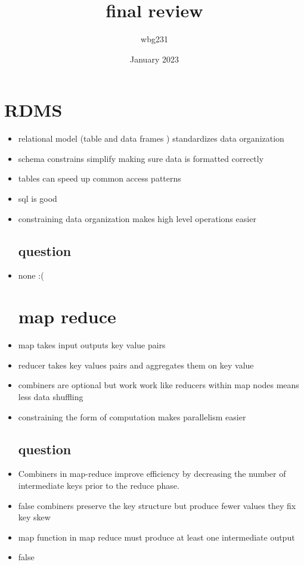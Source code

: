 \documentclass{article}
\title{final review }
\author{wbg231 }
\date{January 2023}
\begin{document}
\maketitle

\section{RDMS}
\begin{itemize}
\subsection*{review}
\item relational model (table and data frames ) standardizes data organization 
\item schema constrains simplify making sure data is formatted correctly
\item tables can speed up common access patterns 
\item sql is good 
\item constraining data organization makes high level operations easier 
\subsection*{question}
\item none :(
\section*{map reduce}
\item map takes input outputs key value pairs 
\item reducer takes key values pairs and aggregates them on key value 
\item combiners are optional but work work like reducers within map nodes means less data shuffling
\item constraining the form of computation makes parallelism easier
\subsection*{question}
\item Combiners in map-reduce improve efficiency by decreasing the number of
intermediate keys prior to the reduce phase.
\item false combiners preserve the key structure but produce fewer values they fix key skew 
\item map function in map reduce must produce at least one intermediate output 
\item false

\end{itemize}
\end{document}
